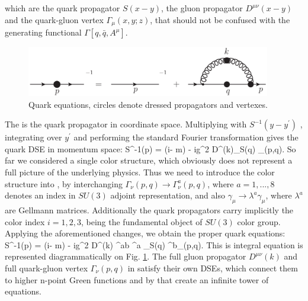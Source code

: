 \eeqa
which are the quark propagator $S(x-y)$, the gluon propagator $D^{\mu\nu}(x-y)$ and the quark-gluon vertex $\Gamma_\mu(x,y;z)$, that should not be confused with the generating functional $\Gamma[q, \bar{q}, A^\mu]$.  
\begin{figure}[t]
\tiny
 \begin{center}
  \includegraphics[width=0.95\textwidth]{figures/quark_DSE_gen.png}
 \end{center}
 \caption{\footnotesize Quark \DS equations, circles denote dressed propagators and vertexes.}\label{fig:quark_DSE_gen} 
\end{figure}
The \Eq{\ref{dse:DSE_coord}} is the quark propagator in coordinate space. Multiplying with $S^{-1}(y-y^{\prime})$ , integrating over $y^\prime$ and performing the standard Fourier transformation gives the quark DSE in momentum space:
\beqa
	\label{dse:DSE_mom}
	S^{-1}(p) = (i\pslash - m) - ig^2\int {} D^{\mu\nu}(k)\gamma_\mu S(q) \Gamma_\nu(p,q)\;.
\eeqa
So far we considered a single color structure, which obviously does not represent a full picture of the underlying physics. Thus we need to introduce the color structure into \Eq{\ref{dse:DSE_mom}}, by interchanging $\Gamma_\nu(p,q) \rightarrow  \Gamma^a_\nu(p,q)$, where $a=1,...,8$ denotes an index in $SU(3)$ adjoint representation, and also $\gamma_\mu \rightarrow \lambda^a \gamma_\mu$, where $\lambda^a$ are Gellmann matrices. Additionally the quark propagators carry implicitly the color index $i=1,2,3$, being the fundamental object of $SU(3)$ color group. Applying the aforementioned changes, we obtain the proper quark \DS equations:
\beqa
\label{dse:DSE_mom_full}
	S^{-1}(p) = (i\pslash - m) - ig^2\int {} D^{\mu\nu}(k) \delta^{ab} \lambda^a \gamma_\mu S(q) \Gamma^b_\nu(p,q)\;.
\eeqa
This is integral equation is represented diagrammatically on Fig. \ref{fig:quark_DSE_gen}.
The full gluon propagator $D^{\mu\nu}(k)$ and full quark-gluon vertex $\Gamma_\nu(p,q)$ in \Eq{\ref{dse:DSE_mom_full}} satisfy their own DSEs, which connect them to higher n-point Green functions and by that create an infinite tower of equations. \\

